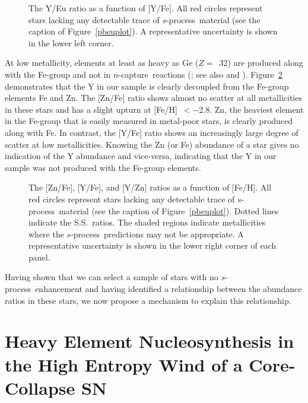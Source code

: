 \documentclass{emulateapj}
\def\spro{\mbox{$s$-process}}
\def\ncap{\mbox{$n$-capture}}
\begin{document}
\begin{figure}
\begin{center}
\end{center}
\caption{
\label{resultplot2}
The Y/Eu ratio as a function of [Y/Fe].
All red circles represent stars lacking any detectable
trace of \spro\ material (see the caption of Figure~\ref{pbeuplot}).
A representative uncertainty is shown 
in the lower left corner.
}
\end{figure}

At low metallicity, elements at least as heavy as Ge ($Z =$~32)
are produced along with the Fe-group and not in \ncap\ reactions
(\citealt{cowan05}; see also \citealt{frohlich06} and \citealt{farouqi09}).
Figure~\ref{znyplot} demonstrates that the Y in our sample
is clearly decoupled from the Fe-group elements Fe and Zn.
The [Zn/Fe] ratio shows almost no scatter at all metallicities
in these stars and has a slight upturn at [Fe/H]~$< -$2.8.
Zn, the heaviest element in the Fe-group that is easily 
measured in metal-poor stars, is clearly produced along with Fe.
In contrast, the [Y/Fe] ratio shows an increasingly large degree
of scatter at low metallicities.
Knowing the Zn (or Fe) abundance of a star gives no indication
of the Y abundance and vice-versa, indicating that the Y in our
sample was not produced with the Fe-group elements.

\begin{figure}
\begin{center}
\end{center}
\caption{
\label{znyplot}
The [Zn/Fe], [Y/Fe], and [Y/Zn] ratios as a function of [Fe/H].
All red circles represent stars lacking any detectable
trace of \spro\ material (see the caption of Figure~\ref{pbeuplot}).
Dotted lines indicate the S.S.\ ratios.
The shaded regions indicate metallicities where the
\spro\ predictions may not be appropriate.
A representative uncertainty is shown 
in the lower right corner of each panel.
}
\end{figure}

Having shown that we can select a sample of stars with no \spro\ 
enhancement and having identified a relationship between the
abundance ratios in these stars, we now 
propose a mechanism to explain this relationship.
 

\section{Heavy Element Nucleosynthesis in the High Entropy Wind
of a Core-Collapse SN}
\label{hew}
\end{document}
